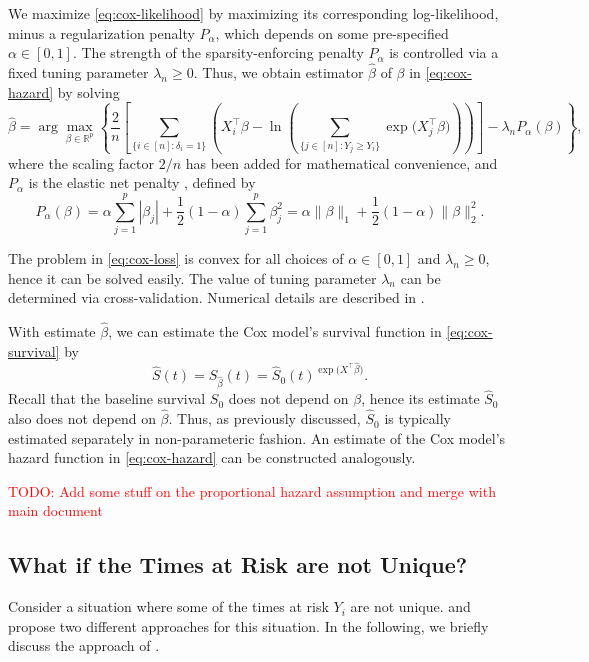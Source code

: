 \documentclass[11pt]{article}
\newcommand{\R}{\mathbb{R}}
\begin{document}
We maximize \eqref{eq:cox-likelihood} by maximizing its corresponding log-likelihood, minus a regularization penalty $P_\alpha$, which depends on some pre-specified $\alpha \in [0,1]$. The strength of the sparsity-enforcing penalty $P_\alpha$ is controlled via a fixed tuning parameter $\lambda_n \geq 0$. Thus, we obtain estimator $\widehat{\beta}$ of $\beta$ in \eqref{eq:cox-hazard} by solving
\begin{equation} \label{eq:cox-loss}
    \widehat{\beta} 
    =
    \arg\max_{\beta \in \R^p}
    \left\{
        \frac{2}{n}
        \left[
            \sum_{\{i\in[n]:\delta_i = 1\}}
            \left(
            X_i^\top \beta
            -
            \ln
            \left(
            \sum_{\{ j\in[n] : Y_j \geq Y_i \}}
            \exp
            \big(
            X_j^\top \beta
            \big)
            \right)
            \right)
        \right]
        -
        \lambda_n
        P_\alpha (\beta)
    \right\},
\end{equation}
where the scaling factor $2/n$ has been added for mathematical convenience, and $P_\alpha$ is the elastic net penalty \citep{zou2005}, defined by
\[
    P_\alpha (\beta) = \alpha \sum_{j=1}^p |\beta_j| + \frac{1}{2} (1 - \alpha) \sum_{j=1}^p \beta_j^2
    =
    \alpha \|\beta \|_1 + \frac{1}{2} (1-\alpha) \|\beta \|_2^2.
\]

The problem in \eqref{eq:cox-loss} is convex for all choices of $\alpha \in [0,1]$ and $\lambda_n \geq 0$, hence it can be solved easily. The value of tuning parameter $\lambda_n$ can be determined via cross-validation. Numerical details are described in \cite{simon2011}.

With estimate $\widehat{\beta}$, we can estimate the Cox model's survival function in \eqref{eq:cox-survival} by
\[
    \widehat{S}(t) = S_{\widehat{\beta}}(t)
    =
    \widehat{S}_0(t)^{\exp\big(X^\top \widehat{\beta}\big)}.
\]
Recall that the baseline survival $S_0$ does not depend on $\beta$, hence its estimate $\widehat{S}_0$ also does not depend on $\widehat{\beta}$. Thus, as previously discussed, $\widehat{S}_0$ is typically estimated separately in non-parameteric fashion. An estimate of the Cox model's hazard function in \eqref{eq:cox-hazard} can be constructed analogously.

\textcolor{red}{TODO: Add some stuff on the proportional hazard assumption and merge with main document}

\subsection{What if the Times at Risk are not Unique?} \label{sec:non-unique-times}
Consider a situation where some of the times at risk $Y_i$ are not unique. \cite{breslow1975} and \cite{efron1977} propose two different approaches for this situation. In the following, we briefly discuss the approach of \cite{breslow1975}.
\end{document}
